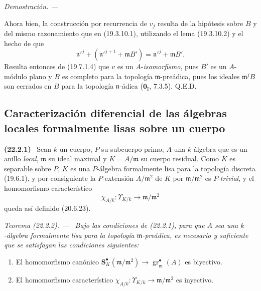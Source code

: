 \documentclass[10pt,oneside]{book}
\makeatletter
\newcommand{\setmanualcurrentlabel}[1]{\def\@currentlabel{#1}}
\newcommand{\oldpage}[2][]{%
  \setcounter{footnote}{0}%
  \marginpar{\scriptsize\textbf{#1}~|~#2}\ignorespaces}
\newenvironment{env}[1][]{\setmanualcurrentlabel{#1}\par\medskip\noindent\textbf{(#1)}\ }{\par}
\newenvironment{theorem}[1][]{%
  \setmanualcurrentlabel{#1}\par\medskip\noindent\itshape Teorema (#1). ---\ }{\par}
\newenvironment{proof}{%
  \par\medskip\noindent\textit{Demostración. ---\ }}{\par}
\makeatother
\begin{document}
\begin{proof}
\oldpage[0\textsubscript{IV-1}]{186}

Ahora bien, la construcción por recurrencia de $v_j$ resulta de la hipótesis
sobre $B$ y del mismo razonamiento que en (19.3.10.1), utilizando el lema
(19.3.10.2) y el hecho de que
\[
  \mathfrak n'^j+(\mathfrak n'^{j+1}+\mathfrak mB')
  =\mathfrak n'^j+\mathfrak mB'.
\]
Resulta entonces de (19.7.1.4) que $v$ es un $A$-\emph{isomorfismo}, pues
$B'$ es un $A$-módulo plano y $B$ es completo para la topología
$\mathfrak m$-preádica, pues los ideales $\mathfrak m^jB$ son cerrados en $B$
para la topología $\mathfrak n$-ádica ($\mathbf 0_{\mathrm I}$, 7.3.5).
Q.E.D.
\end{proof}

\subsection{Caracterización diferencial de las álgebras locales formalmente
lisas sobre un cuerpo}
\label{subsection:0.22.2-es}

\begin{env}[22.2.1]
\label{0.22.2.1-es}
Sean $k$ un cuerpo, $P$ su subcuerpo primo, $A$ una $k$-álgebra que es un
anillo \emph{local}, $\mathfrak m$ su ideal maximal y $K=A/\mathfrak m$ su
cuerpo residual. Como $K$ es separable sobre $P$, $K$ es una $P$-álgebra
formalmente lisa para la topología discreta (19.6.1), y por consiguiente la
$P$-extensión $A/\mathfrak m^2$ de $K$ por $\mathfrak m/\mathfrak m^2$ es
$P$-\emph{trivial}, y el homomorfismo característico
\begin{equation}
\tag{22.2.1.1}
\label{0.22.2.1.1-es}
  \chi_{A/k}:\Upsilon_{K/k}\longrightarrow\mathfrak m/\mathfrak m^2
\end{equation}
queda así definido (20.6.23).
\end{env}

\begin{theorem}[22.2.2]
\label{0.22.2.2-es}
Bajo las condiciones de \textup{(22.2.1)}, para que $A$ sea una $k$-álgebra
formalmente lisa para la topología $\mathfrak m$-preádica, es necesario y
suficiente que se satisfagan las condiciones siguientes:
\begin{enumerate}
  \item[\textup{(i)}] El homomorfismo canónico
  $\mathbf S_K^\bullet(\mathfrak m/\mathfrak m^2)\to
  \operatorname{gr}_{\mathfrak m}^\bullet(A)$ es biyectivo.
  \item[\textup{(ii)}] El homomorfismo característico
  $\chi_{A/k}:\Upsilon_{K/k}\to\mathfrak m/\mathfrak m^2$ es inyectivo.
\end{enumerate}
\end{theorem}
\end{document}
